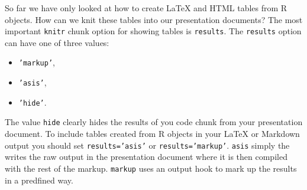 So far we have only looked at how to create LaTeX and HTML tables from R objects. How can we knit these tables into our presentation documents? The most important \texttt{knitr} chunk option for showing tables is \texttt{results}. The \texttt{results} option can have one of three values:

\begin{itemize}
\item
  \texttt{'markup'},
\item
  \texttt{'asis'},
\item
  \texttt{'hide'}.
\end{itemize}

\noindent The value \texttt{hide} clearly hides the results of you code chunk from your presentation document. To include tables created from R objects in your LaTeX or Markdown output you should set \texttt{results='asis'} or \texttt{results='markup'}. \texttt{asis} simply the writes the raw output in the presentation document where it is then compiled with the rest of the markup. \texttt{markup} uses an output hook to mark up the results in a predfined way.  



